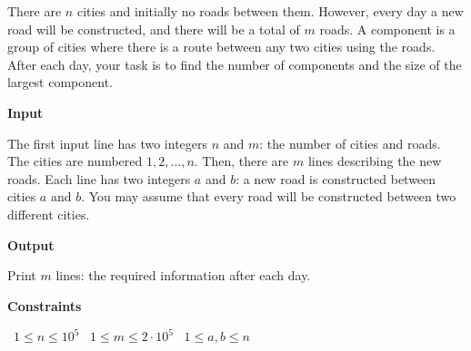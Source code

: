 There are $n$ cities and initially no roads between them. However, every day a new road will be constructed, and there will be a total of $m$ roads.
A component is a group of cities where there is a route between any two cities using the roads. After each day, your task is to find the number of components and the size of the largest component.

\vspace{0.3cm}\noindent\textbf{Input}

The first input line has two integers $n$ and $m$: the number of cities and roads. The cities are numbered $1,2,\dots,n$.
Then, there are $m$ lines describing the new roads. Each line has two integers $a$ and $b$: a new road is constructed between cities $a$ and $b$.
You may assume that every road will be constructed between two different cities.

\vspace{0.3cm}\noindent\textbf{Output}

Print $m$ lines: the required information after each day.

\vspace{0.3cm}\noindent\textbf{Constraints}

\textbullet\ $1 \le n \le 10^5$
\textbullet\ $1 \le m \le 2 \cdot 10^5$
\textbullet\ $1 \le a,b \le n$
